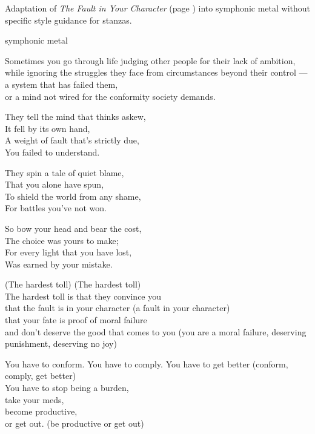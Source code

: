 
\begin{notes}
Adaptation of \emph{The Fault in Your Character} (page \pageref{sec:fault-in-your-character}) into symphonic metal without specific style guidance for stanzas.
\end{notes}
\begin{style}
symphonic metal
\end{style}
\begin{lyrics}
Sometimes you go through life judging other people for their lack of ambition,\\
while ignoring the struggles they face from circumstances beyond their control
—a system that has failed them,\\
or a mind not wired for the conformity society demands.

They tell the mind that thinks askew,\\
It fell by its own hand,\\
A weight of fault that's strictly due,\\
You failed to understand.

They spin a tale of quiet blame,\\
That you alone have spun,\\
To shield the world from any shame,\\
For battles you've not won.

So bow your head and bear the cost,\\
The choice was yours to make;\\
For every light that you have lost,\\
Was earned by your mistake.

(The hardest toll)
(The hardest toll)\\
The hardest toll is that they convince you\\
that the fault is in your character
(a fault in your character)\\
that your fate is proof of moral failure\\
and don't deserve the good that comes to you
(you are a moral failure, deserving punishment, deserving no joy)

You have to conform. You have to comply. You have to get better
(conform, comply, get better)\\
You have to stop being a burden,\\
take your meds,\\
become productive,\\
or get out.
(be productive or get out)


\end{lyrics}
